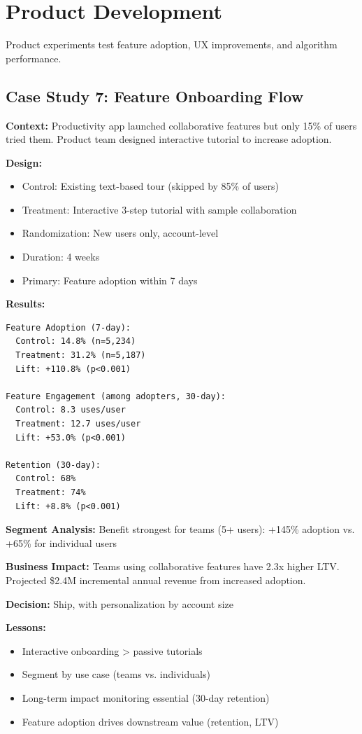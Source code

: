 \section{Product Development}

Product experiments test feature adoption, UX improvements, and algorithm performance.

\subsection{Case Study 7: Feature Onboarding Flow}

\textbf{Context:} Productivity app launched collaborative features but only 15\% of users tried them. Product team designed interactive tutorial to increase adoption.

\textbf{Design:}
\begin{itemize}
    \item Control: Existing text-based tour (skipped by 85\% of users)
    \item Treatment: Interactive 3-step tutorial with sample collaboration
    \item Randomization: New users only, account-level
    \item Duration: 4 weeks
    \item Primary: Feature adoption within 7 days
\end{itemize}

\textbf{Results:}
\begin{verbatim}
Feature Adoption (7-day):
  Control: 14.8% (n=5,234)
  Treatment: 31.2% (n=5,187)
  Lift: +110.8% (p<0.001)

Feature Engagement (among adopters, 30-day):
  Control: 8.3 uses/user
  Treatment: 12.7 uses/user
  Lift: +53.0% (p<0.001)

Retention (30-day):
  Control: 68%
  Treatment: 74%
  Lift: +8.8% (p<0.001)
\end{verbatim}

\textbf{Segment Analysis:} Benefit strongest for teams (5+ users): +145\% adoption vs. +65\% for individual users

\textbf{Business Impact:} Teams using collaborative features have 2.3x higher LTV. Projected \$2.4M incremental annual revenue from increased adoption.

\textbf{Decision:} Ship, with personalization by account size

\textbf{Lessons:}
\begin{itemize}
    \item Interactive onboarding > passive tutorials
    \item Segment by use case (teams vs. individuals)
    \item Long-term impact monitoring essential (30-day retention)
    \item Feature adoption drives downstream value (retention, LTV)
\end{itemize}

